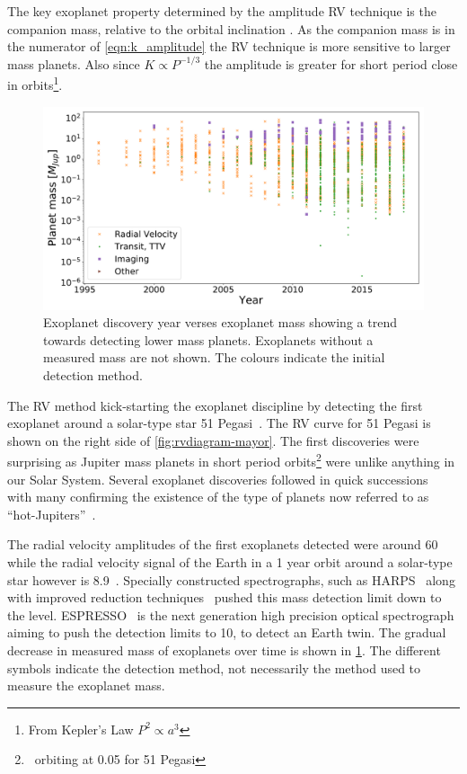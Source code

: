 The key exoplanet property determined by the amplitude {RV} technique is the companion mass, relative to the orbital inclination \Mpsini.
As the companion mass is in the numerator of \cref{eqn:k_amplitude} the {RV} technique is more sensitive to larger mass planets.
Also since $K \propto P^{-1/3}$ the amplitude is greater for short period close in orbits\footnote{From Kepler's Law ${P}^{2}\propto {a}^{3}$}.

\begin{figure}
    \centering
    \includegraphics[width=0.7\linewidth]{figures/introduction/exoplanetEU_year_mass.pdf}
    \caption{Exoplanet discovery year verses exoplanet mass showing a trend towards detecting lower mass planets.
        Exoplanets without a measured mass are not shown.
        The colours indicate the initial detection method.}
    \label{fig:exoplaneteuyearmass}
\end{figure}

The RV method kick-starting the exoplanet discipline by detecting the first exoplanet around a solar-type star {51 Pegasi}~\citep{mayor_jupitermass_1995}.
The RV curve for {51 Pegasi} is shown on the right side of \ref{fig:rvdiagram-mayor}.
The first discoveries were surprising as Jupiter mass planets in short period orbits\footnote{\,\Mjup{} orbiting at 0.05\AU{} for {51 Pegasi}} were unlike anything in our Solar System.
Several exoplanet discoveries followed in quick successions~\citep[e.g.][]{butler_planet_1996, marcy_planetary_1996} with many confirming the existence of the type of planets now referred to as ``hot-Jupiters''~\citep{butler_three_1997, charbonneau_detection_2000}.

The radial velocity amplitudes of the first exoplanets detected were around 60\mps{} while
the radial velocity signal of the Earth in a 1 year orbit around a solar-type star however is 8.9\cmps{}~\citep{figueira_radial_2010}.
Specially constructed spectrographs, such as HARPS~\citep{mayor_setting_2003} along with improved reduction techniques~\citep{lovis_new_2007} pushed this mass detection limit down to the \mps{} level.
ESPRESSO~\citep{pepe_espresso_2014, megevand_espresso_2014} is the next generation high precision optical spectrograph aiming to push the detection limits to 10\cmps, to detect an Earth twin.
The gradual decrease in measured mass of exoplanets over time is shown in \cref{fig:exoplaneteuyearmass}.
The different symbols indicate the detection method, not necessarily the method used to measure the exoplanet mass.

